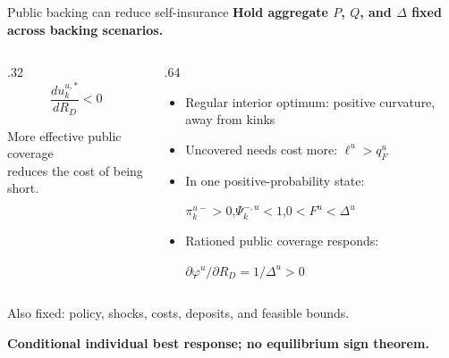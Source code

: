 \documentclass[aspectratio=169,17pt]{beamer}
\newcommand{\framescope}{Joint IE1 environment / individual extension}
\newcommand{\scope}[1]{\gdef\framescope{#1}}
\newcommand{\smallcopy}{\fontsize{18}{23}\selectfont}
\newcommand{\midcopy}{\fontsize{20}{26}\selectfont}
\begin{document}
\scope{Derived: CONDITIONAL INDIVIDUAL BEST RESPONSE}
\begin{frame}{Public backing can reduce self-insurance}
\relax
{\midcopy\bfseries Hold aggregate $P$, $Q$, and $\Delta$ fixed across backing scenarios.}\par
\vspace{6mm}
\begin{columns}[c,onlytextwidth]
\begin{column}{.32\textwidth}
{\fontsize{49}{58}\selectfont
\[
\frac{d u_k^{u,*}}{dR_D}<0
\]}
\vspace{2mm}
{\midcopy\color{teal}\centering
More effective public coverage\\reduces the cost of being short.\par}
\end{column}
\begin{column}{.64\textwidth}
{\midcopy
\begin{itemize}\setlength{\itemsep}{9pt}
\item Regular interior optimum: positive curvature, away from kinks
\item Uncovered needs cost more: $\ell^u>q_F^u$
\item In one positive-probability state:\par
$\pi_k^{u-}>0$,\quad $\Psi_k^{-,u}<1$,\quad $0<F^u<\Delta^u$
\item Rationed public coverage responds:\par
$\partial\varphi^u/\partial R_D=1/\Delta^u>0$
\end{itemize}}
\end{column}
\end{columns}
\vspace{5mm}
{\smallcopy\color{muted}
Also fixed: policy, shocks, costs, deposits, and feasible bounds.\par
\textbf{Conditional individual best response; no equilibrium sign theorem.}}

\end{frame}
\end{document}
